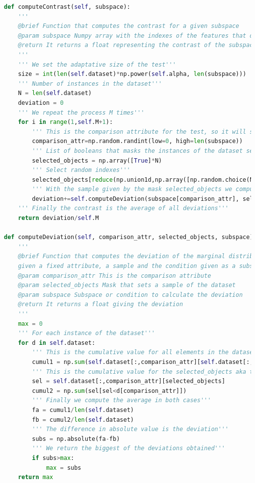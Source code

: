 \begin{lstlisting}[language=Python]
def computeContrast(self, subspace):
	'''
	@brief Function that computes the contrast for a given subspace
	@param subspace Numpy array with the indexes of the features that define the subspace
	@return It returns a float representing the contrast of the subspace
	'''
	''' We set the adaptative size of the test'''
	size = int(len(self.dataset)*np.power(self.alpha, len(subspace)))
	''' Number of instances in the dataset'''
	N = len(self.dataset)
	deviation = 0
	''' We repeat the process M times'''
	for i in range(1,self.M+1):
		''' This is the comparison attribute for the test, so it will stay untouched'''
		comparison_attr=np.random.randint(low=0, high=len(subspace))
		''' List of booleans that masks the instances of the dataset selected'''
		selected_objects = np.array([True]*N)
		''' Select random indexes'''
		selected_objects[reduce(np.union1d,np.array([np.random.choice(N,size=size,replace=False) for _ in range(len(subspace)-1)]))]=False
		''' With the sample given by the mask selected_objects we compute the deviation'''
		deviation+=self.computeDeviation(subspace[comparison_attr], selected_objects, subspace)
	''' Finally the contrast is the average of all deviations'''
	return deviation/self.M

def computeDeviation(self, comparison_attr, selected_objects, subspace):
	'''
	@brief Function that computes the deviation of the marginal distribution
	given a fixed attribute, a sample and the condition given as a subspace
	@param comparison_attr This is the comparison attribute
	@param selected_objects Mask that sets a sample of the dataset
	@param subspace Subspace or condition to calculate the deviation
	@return It returns a float giving the deviation
	'''
	max = 0
	''' For each instance of the dataset'''
	for d in self.dataset:
		''' This is the cumulative value for all elements in the dataset'''
		cumul1 = np.sum(self.dataset[:,comparison_attr][self.dataset[:,comparison_attr]<d[comparison_attr]])
		''' This is the cumulative value for the selected_objects aka the sample'''
		sel = self.dataset[:,comparison_attr][selected_objects]
		cumul2 = np.sum(sel[sel<d[comparison_attr]])
		''' Finally we compute the average in both cases'''
		fa = cumul1/len(self.dataset)
		fb = cumul2/len(self.dataset)
		''' The difference in absolute value is the deviation'''
		subs = np.absolute(fa-fb)
		''' We return the biggest of the deviations obtained'''
		if subs>max:
			max = subs
	return max


\end{lstlisting}
